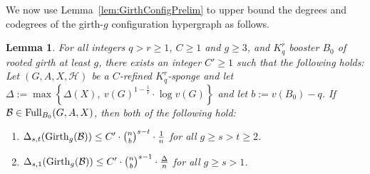 \documentclass[11pt]{article}
\newcommand{\mc}[1]{\mathcal{#1}}
\newcounter{i}
\theoremstyle{plain}
\newtheorem{lem}[thm]{Lemma}
\theoremstyle{plain} %
\theoremstyle{definition}
\begin{document}
We now use Lemma~\ref{lem:GirthConfigPrelim} to upper bound the degrees and codegrees of the girth-$g$ configuration hypergraph as follows.


\begin{lem}\label{lem:GirthConfigBoosterDegrees}
For all integers $q>r\ge 1$, $C\ge 1$ and $g\ge 3$, and $K_q^r$ booster $B_0$ of rooted girth at least $g$, there exists an integer $C'\ge 1$ such that the following holds: Let $(G,A,X,\mc{H})$ be a $C$-refined $K_q^r$-sponge and let $\Delta := \max\left\{ \Delta(X),~v(G)^{1-\frac{1}{r}}\cdot \log v(G)\right\}$ and let $b:=v(B_0)-q$. If $\mc{B} \in {\rm Full}_{B_0}(G,A,X)$, then
both of the following hold:
\begin{enumerate}
    \item[(1)] $\Delta_{s,t}({\rm Girth}_g(\mc{B}))\le C'\cdot \binom{n}{b}^{s-t}\cdot \frac{1}{n}$ for all $g\ge s > t \ge 2$. 
    \item[(2)] $\Delta_{s,1}({\rm Girth}_g(\mc{B}))\le C'\cdot \binom{n}{b}^{s-1}\cdot \frac{\Delta}{n}$ for all $g\ge s > 1$. 
\end{enumerate}    
\end{lem}
\end{document}
